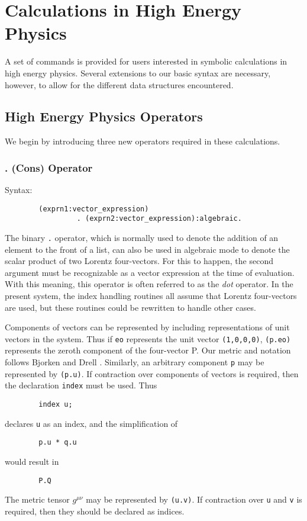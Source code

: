 \chapter{Calculations in High Energy Physics}

A set of {\REDUCE} commands is provided for users interested in symbolic
calculations in high energy physics. Several extensions to our basic
syntax are necessary, however, to allow for the different data structures
encountered.

\section{High Energy Physics Operators}
\label{HEPHYS}
\hypertarget{command:INDEX}{}

We begin by introducing three new operators required in these calculations.

\subsection{. (Cons) Operator}
Syntax:
\begin{verbatim}
        (exprn1:vector_expression)
                 . (exprn2:vector_expression):algebraic.
\end{verbatim}
The binary \texttt{.} operator, which is normally used to denote the addition
of an element to the front of a list, can also be used in algebraic mode
to denote the scalar product of two Lorentz four-vectors.  For this to
happen, the second argument must be recognizable as a vector expression
 at the time of
evaluation.  With this meaning, this operator is often referred to as the
\emph{dot} operator.  In the present system, the index handling routines all
assume that Lorentz four-vectors are used, but these routines could be
rewritten to handle other cases.

Components of vectors can be represented by including representations of
unit vectors in the system.  Thus if \texttt{eo} represents the unit vector
\texttt{(1,0,0,0)}, \texttt{(p.eo)} represents the zeroth component of the
four-vector P.  Our metric and notation follows Bjorken and Drell \cite{BjorkenDrell:1965}.
Similarly, an arbitrary component \texttt{p} may be represented by
\texttt{(p.u)}.  If contraction over components of vectors is required, then
the declaration \texttt{index} must be used.  Thus
\begin{verbatim}
        index u;
\end{verbatim}
declares \texttt{u} as an index, and the simplification of
\begin{verbatim}
        p.u * q.u
\end{verbatim}
would result in
\begin{verbatim}
        P.Q
\end{verbatim}
The metric tensor $g^{\mu \nu}$ may be represented by \texttt{(u.v)}.  If
contraction over \texttt{u} and \texttt{v} is required, then they should be
declared as indices.

